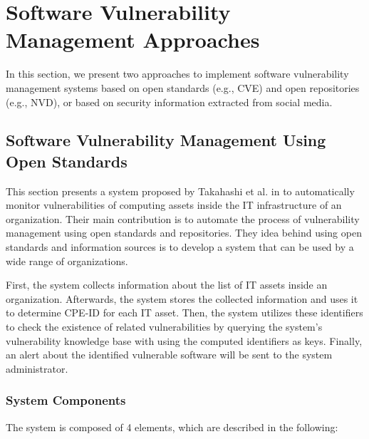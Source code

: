 \documentclass{llncs}
\begin{document}
\section{Software	Vulnerability	Management	Approaches}
 
 In this section, we present two approaches to implement software vulnerability management systems based on  open standards (e.g., CVE) and open repositories (e.g., NVD), or based on  security information extracted from social media.
\subsection{Software	Vulnerability	Management	Using	Open	Standards}

\par This section presents a system proposed by Takahashi et al. in \cite{paper1} to automatically monitor vulnerabilities of computing assets inside the IT infrastructure of an organization. Their main contribution is to automate the process of vulnerability management using open standards and repositories. They idea behind using open standards and information sources is to develop a system that can be used  by a wide range of organizations.
\par
 First, the system collects information about the list of IT assets inside an organization. Afterwards, the system stores the collected information and uses it to determine CPE-ID for each IT asset. Then, the system utilizes these identifiers to check the existence of related vulnerabilities by querying the system's vulnerability knowledge base with using the computed identifiers as keys. Finally, an alert about the identified vulnerable software will be sent to the system administrator.
    
\subsubsection {System Components }

\begin{flushleft}
 The system is composed of 4 elements, which are described in the following:
\end{flushleft}
\end{document}
